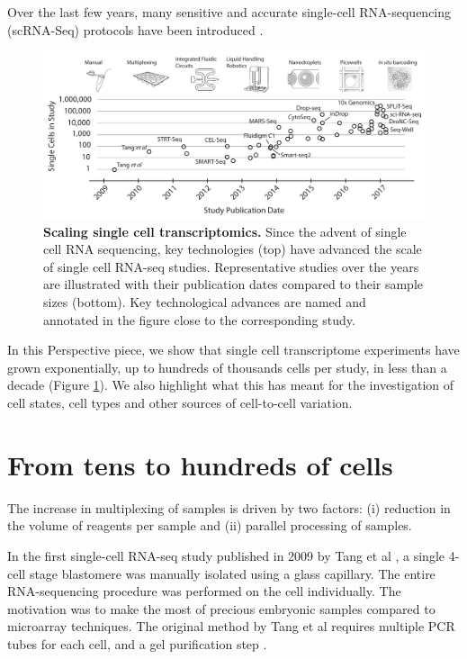 Over the last few years, many sensitive and accurate single-cell RNA-sequencing
(scRNA-Seq) protocols have been introduced \cite{Svensson2017-pf}.

\begin{figure}
    \centering
    \centerline{\includegraphics[width=\textwidth]{"main-figure"}}
    \caption[Scaling single cell transcriptomics]{\textbf{Scaling single cell transcriptomics.} Since the advent of single cell RNA sequencing, key technologies (top) have advanced the scale of single cell RNA-seq studies. Representative studies over the years are illustrated with their publication dates compared to their sample sizes (bottom). Key technological advances are named and annotated in the figure close to the corresponding study.}
    \label{fig:scaling}
\end{figure}

In this Perspective piece, we show that single cell transcriptome experiments have grown exponentially, up to hundreds of thousands cells per study, in less than a decade (Figure \ref{fig:scaling}). We also highlight what this has meant for the investigation of cell states, cell types and other sources of cell-to-cell variation.

\section{From tens to hundreds of cells}

The increase in multiplexing of samples is driven by two factors: (i) reduction in the volume of reagents per sample and (ii) parallel processing of samples.

In the first single-cell RNA-seq study published in 2009 by Tang et al \cite{Tang2009-af}, a single 4-cell stage blastomere was manually isolated using a glass capillary. The entire RNA-sequencing procedure was performed on the cell individually. The motivation was to make the most of precious embryonic samples compared to microarray techniques. The original method by Tang et al requires multiple PCR tubes for each cell, and a gel purification step \cite{Sasagawa2013-ps, Tang2010-am}.

